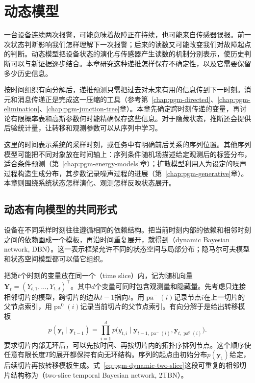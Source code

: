 \chapter{动态模型}
\label{chap:pgm-dynamic}

一台设备连续两次报警，可能意味着故障正在持续，也可能来自传感器误报。前一次状态判断影响我们怎样理解下一次报警；后来的读数又可能改变我们对故障起点的判断。动态模型把设备状态的演化与传感器产生读数的机制分别表示，使历史判断可以与新证据逐步结合。本章研究这种递推怎样保存不确定性，以及它需要保留多少历史信息。

按时间组织有向分解后，递推预测只需把过去对未来有用的信息传到下一时刻。消元和消息传递正是完成这一压缩的工具（参考第~\ref{chap:pgm-directed}、\ref{chap:pgm-elimination}、\ref{chap:pgm-junction-tree}章）。本章先确定跨时刻传递的变量，再讨论有限概率表和高斯参数何时能精确保存这些信息。对于隐藏状态，推断还会提供后验统计量，让转移和观测参数可以从序列中学习。

这里的时间表示系统的采样时刻，或任务中有明确前后关系的序列位置。其他序列模型可能把不同对象放在时间轴上：序列条件随机场描述给定观测后的标签分布，适合条件预测（第~\ref{chap:pgm-energy-models}章）；扩散模型利用人为设定的噪声过程构造生成分布，其步数记录噪声过程的进展（第~\ref{chap:pgm-generative}章）。本章则围绕系统状态怎样演化、观测怎样反映状态展开。

\section{动态有向模型的共同形式}
\label{sec:pgm-dynamic-common}

设备在不同采样时刻往往遵循相同的依赖结构。把当前时刻内部的依赖和相邻时刻之间的依赖画成一个模板，再沿时间重复展开，就得到（dynamic Bayesian network, DBN）。这一表示框架允许不同的状态空间与局部分布；隐马尔可夫模型和状态空间模型都可以借它组织。

把第$t$个时刻的变量放在同一个（time slice）内，记为随机向量$\bm{Y}_t=(Y_{t,1},\ldots,Y_{t,d})^\top$。其中$d$个变量可同时包含观测量和隐藏量。先考虑只连接相邻切片的模型，跨切片的边从$t-1$指向$t$。用$\operatorname{pa}^{-}(i)$记录节点$i$在上一切片的父节点索引，用$\operatorname{pa}^{0}(i)$记录当前切片的父节点索引。有向分解于是给出转移模板
\begin{equation}
  p(\bm{y}_t\mid\bm{y}_{t-1})
  =\prod_{i=1}^{d}
    p\bigl(y_{t,i}\mid
      \bm{y}_{t-1,\operatorname{pa}^{-}(i)},
      \bm{y}_{t,\operatorname{pa}^{0}(i)}\bigr).
  \label{eq:pgm-dynamic-two-slice}
\end{equation}
要求切片内部无环后，可以先按时间、再按切片内的拓扑序排列节点。这个顺序使任意有限长度$T$的展开都保持有向无环结构。序列的起点由初始分布$p(\bm{y}_1)$给定，后续切片再按转移模板生成。式~\eqref{eq:pgm-dynamic-two-slice}这段可重复的相邻切片结构称为（two-slice temporal Bayesian network, 2TBN）。

